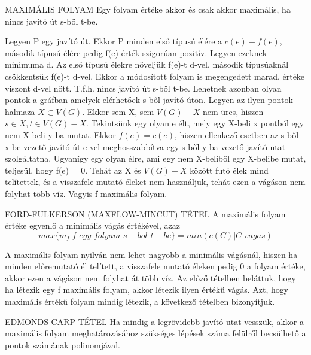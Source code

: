 \begin{tetel}{MAXIMÁLIS FOLYAM}
Egy folyam értéke akkor és csak akkor maximális, ha nincs javító út s-ből t-be.
\end{tetel}

\begin{bizonyitas}{}
Legyen P egy javító út. Ekkor P minden első típusú élére a $c(e) - f(e)$, második típusú élére pedig f(e) érték szigorúan pozitív. Legyen ezeknek minimuma d. Az első típusú élekre növeljük f(e)-t d-vel, második típusúaknál csökkentsük f(e)-t d-vel. Ekkor a módosított folyam is megengedett marad, értéke viszont d-vel nőtt. T.f.h. nincs javító út s-ből t-be. Lehetnek azonban olyan pontok a gráfban amelyek elérhetőek s-ből javító úton. Legyen az ilyen pontok halmaza $X \subset V(G)$. Ekkor sem X, sem $V(G) - X$ nem üres, hiszen $s \in X, t\in V(G) - X$. Tekintsünk egy olyan e élt, mely egy X-beli x pontból egy nem X-beli y-ba mutat. Ekkor $f(e) = c(e)$, hiszen ellenkező esetben az s-ből x-be vezető javító út e-vel meghosszabbítva egy s-ből y-ba vezető javító utat szolgáltatna. Ugyanígy egy olyan élre, ami egy nem X-beliből egy X-belibe mutat, teljesül, hogy f(e) = 0. Tehát az X és $V(G) - X$ között futó élek mind telítettek, és a visszafele mutató éleket nem használjuk, tehát ezen a vágáson nem folyhat több víz. Vagyis f maximális folyam.
\end{bizonyitas}

\begin{tetel}{FORD-FULKERSON (MAXFLOW-MINCUT) TÉTEL}
A maximális folyam értéke egyenlő a minimális vágás értékével, azaz
$$max\{m_f|f\,\,egy\,\,folyam\,\,s-bol\,\,t-be\} = min(c(C)|C\,\,vagas)$$
\end{tetel}

\begin{bizonyitas}{}
A maximális folyam nyilván nem lehet nagyobb a minimális vágásnál, hiszen ha minden előremutató él telített, a visszafele mutató éleken pedig 0 a folyam értéke, akkor ezen a vágáson nem folyhat át több víz. Az előző tételben beláttuk, hogy ha létezik egy f maximális folyam, akkor létezik ilyen értékű vágás. Azt, hogy maximális értékű folyam mindig létezik, a következő tételben bizonyítjuk.
\end{bizonyitas}

\begin{tetel}{EDMONDS-CARP TÉTEL}
Ha mindig a legrövidebb javító utat vesszük, akkor a maximális folyam meghatározásához szükséges lépések száma felülről becsülhető a pontok számának polinomjával.
\end{tetel}
